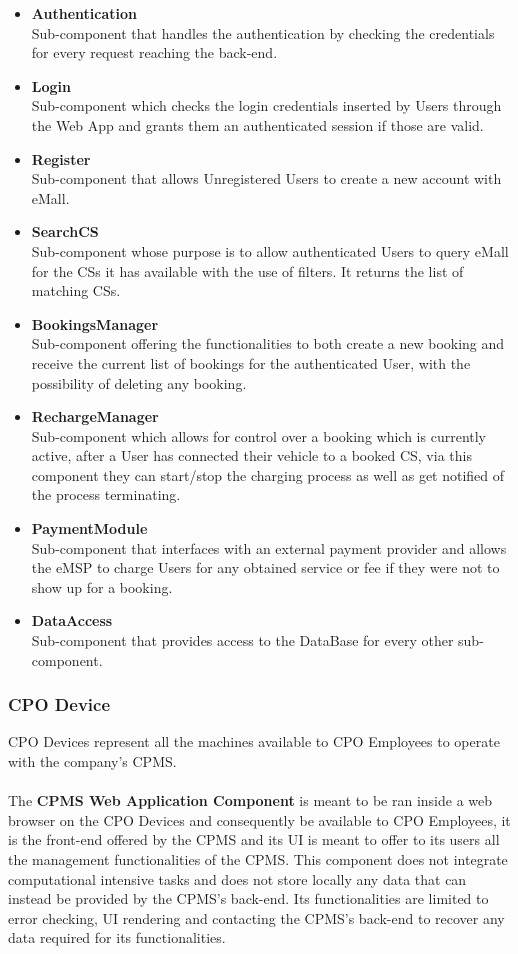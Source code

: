 \documentclass[11pt]{article}
\begin{document}
\begin{itemize}
    \item \textbf{Authentication} \\
        Sub-component that handles the authentication by checking the credentials for every request reaching the back-end.
    \item \textbf{Login} \\
        Sub-component which checks the login credentials inserted by Users through the Web App and grants them an authenticated session if those are valid.
    \item \textbf{Register} \\
        Sub-component that allows Unregistered Users to create a new account with eMall.
    \item \textbf{SearchCS} \\
        Sub-component whose purpose is to allow authenticated Users to query eMall for the CSs it has available with the use of filters. It returns the list of matching CSs.
    \item \textbf{BookingsManager} \\
        Sub-component offering the functionalities to both create a new booking and receive the current list of bookings for the authenticated User, with the possibility of deleting any booking. 
    \item \textbf{RechargeManager} \\
        Sub-component which allows for control over a booking which is currently active, after a User has connected their vehicle to a booked CS, via this component they can start/stop the charging process as well as get notified of the process terminating.
    \item \textbf{PaymentModule} \\
        Sub-component that interfaces with an external payment provider and allows the eMSP to charge Users for any obtained service or fee if they were not to show up for a booking.
    \item \textbf{DataAccess} \\
        Sub-component that provides access to the DataBase for every other sub-component.
\end{itemize}

\subsubsection{CPO Device}

CPO Devices represent all the machines available to CPO Employees to operate with the company's CPMS. \\
\\
The \textbf{CPMS Web Application Component} is meant to be ran inside a web browser on the CPO Devices and consequently be available to CPO Employees, it is the front-end offered by the CPMS and its UI is meant to offer to its users all the management functionalities of the CPMS. This component does not integrate computational intensive tasks and does not store locally any data that can instead be provided by the CPMS's back-end. Its functionalities are limited to error checking, UI rendering and contacting the CPMS's back-end to recover any data required for its functionalities.
\end{document}
